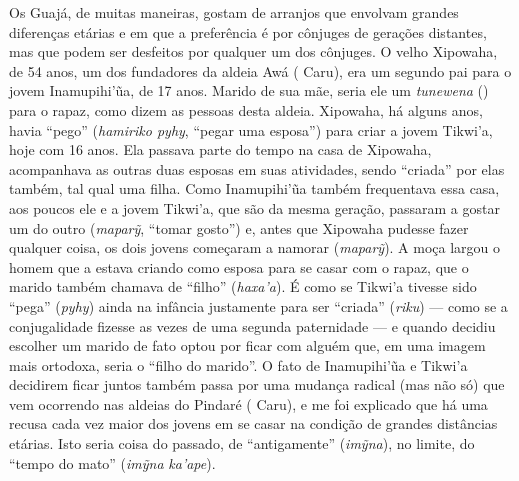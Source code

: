 Os Guajá, de muitas maneiras, gostam de arranjos que envolvam grandes
diferenças etárias e em que a preferência é por cônjuges de gerações
distantes, mas que podem ser desfeitos por qualquer um dos cônjuges. O
velho Xipowaha, de 54 anos, um dos fundadores da aldeia Awá (
Caru), era um segundo pai para o jovem Inamupihi'ũa, de 17 anos. Marido
de sua mãe, seria ele um \emph{tunewena} () para o rapaz, como dizem
as pessoas desta aldeia. Xipowaha, há alguns anos, havia ``pego''
(\emph{hamiriko pyhy}, ``pegar uma esposa'') para criar a jovem Tikwi'a,
hoje com 16 anos. Ela passava parte do tempo na casa de Xipowaha,
acompanhava as outras duas esposas em suas atividades, sendo ``criada''
por elas também, tal qual uma filha. Como Inamupihi'ũa também
frequentava essa casa, aos poucos ele e a jovem Tikwi'a, que são da
mesma geração, passaram a gostar um do outro (\emph{maparỹ}, ``tomar
gosto'') e, antes que Xipowaha pudesse fazer qualquer coisa, os dois
jovens começaram a namorar (\emph{maparỹ}). A moça largou o homem que a
estava criando como esposa para se casar com o rapaz, que o marido
também chamava de ``filho'' (\emph{haxa'a}). É como se Tikwi'a tivesse
sido ``pega'' (\emph{pyhy}) ainda na infância justamente para ser ``criada''
(\emph{riku}) --- como se a conjugalidade fizesse as vezes de uma segunda
paternidade --- e quando decidiu escolher um marido de fato optou por
ficar com alguém que, em uma imagem mais ortodoxa, seria o ``filho do
marido''. O fato de Inamupihi'ũa e Tikwi'a decidirem ficar juntos também
passa por uma mudança radical (mas não só) que vem ocorrendo nas aldeias
do Pindaré ( Caru), e me foi explicado que há uma recusa cada vez
maior dos jovens em se casar na condição de grandes distâncias etárias.
Isto seria coisa do passado, de ``antigamente'' (\emph{imỹna}), no
limite, do ``tempo do mato'' (\emph{imỹna} \emph{ka'ape}).

